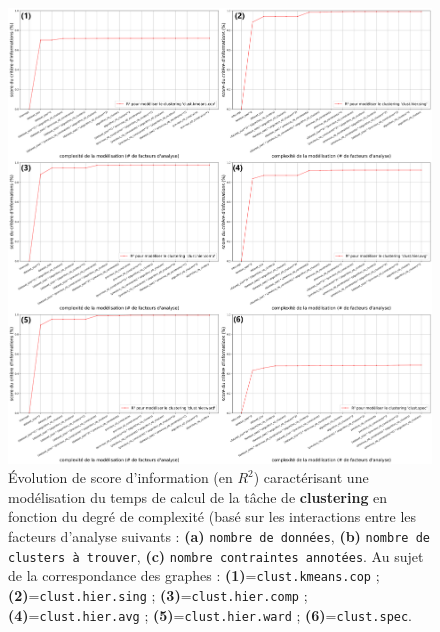 			\begin{figure}[!htb]
				\centering
				\includegraphics[width=\textwidth]{figures/etude-temps-calcul-analyse-facteurs-3clust}
				\caption{Évolution de score d'information (en \(R^2\)) caractérisant une modélisation du temps de calcul de la tâche de \textbf{clustering} en fonction du degré de complexité (basé sur les interactions entre les facteurs d'analyse suivants : \textbf{(a)} \texttt{nombre de données}, \textbf{(b)} \texttt{nombre de clusters à trouver}, \textbf{(c)} \texttt{nombre contraintes annotées}. Au sujet de la correspondance des graphes : \textbf{(1)}=\texttt{clust.kmeans.cop} ; \textbf{(2)}=\texttt{clust.hier.sing} ; \textbf{(3)}=\texttt{clust.hier.comp} ; \textbf{(4)}=\texttt{clust.hier.avg} ; \textbf{(5)}=\texttt{clust.hier.ward} ; \textbf{(6)}=\texttt{clust.spec}.}
				\label{figure:4.3.1-ETUDE-COUTS-TEMPS-CALCUL-ANALYSE-FACTEURS-CLUSTERING}
			\end{figure}
		
